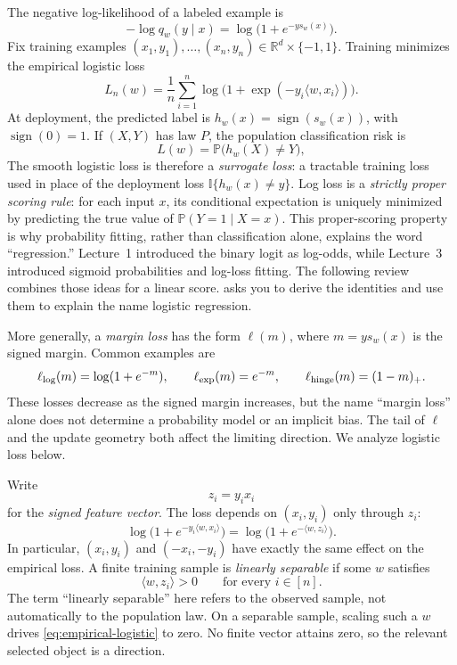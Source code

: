 \documentclass[11pt,twoside]{article}
\newcommand{\I}{\mathbb I}
\newcommand{\one}[1]{\I\{#1\}}
\renewcommand{\P}{\mathbb P}
\newcommand{\R}{\mathbb R}
\newcommand{\sign}{\operatorname{sign}}
\theoremstyle{definition}
\theoremstyle{remark}
\begin{document}
The negative log-likelihood of a labeled example is
\[
 -\log q_w(y\mid x)=\log\bigl(1+e^{-ys_w(x)}\bigr).
\]
Fix training examples
$(x_1,y_1),\ldots,(x_n,y_n)\in\R^d\times\{-1,1\}$. Training minimizes the
empirical logistic loss
\begin{equation}
 L_n(w)=\frac1n\sum_{i=1}^n
 \log\bigl(1+\exp(-y_i\langle w,x_i\rangle)\bigr).
 \label{eq:empirical-logistic}
\end{equation}
At deployment, the predicted label is $h_w(x)=\sign(s_w(x))$, with
$\sign(0)=1$. If $(X,Y)$ has law $P$, the population classification risk is
\begin{equation}
 L(w)=\P\bigl(h_w(X)\ne Y\bigr),
 \label{eq:population-risk}
\end{equation}
The smooth logistic loss is therefore a \emph{surrogate loss}: a tractable
training loss used in place of the deployment loss
$\one{h_w(x)\ne y}$. Log loss is a \emph{strictly proper scoring rule}: for
each input $x$, its conditional expectation is uniquely minimized by
predicting the true value of $\P(Y=1\mid X=x)$. This proper-scoring property
is why probability
fitting, rather than classification alone, explains the word ``regression.''
Lecture~1 introduced the binary logit as log-odds, while Lecture~3 introduced
sigmoid probabilities and log-loss fitting. The following review combines
those ideas
for a linear score.  asks you to derive the
identities and use them to explain the name logistic regression.

More generally, a \emph{margin loss} has the form $\ell(m)$, where
$m=ys_w(x)$ is the signed margin. Common examples are
\[
 \ell_{\rm log}(m)=\log(1+e^{-m}),
 \qquad
 \ell_{\rm exp}(m)=e^{-m},
 \qquad
 \ell_{\rm hinge}(m)=(1-m)_+.
\]
These losses decrease as the signed margin increases, but the name
``margin loss'' alone does not determine a probability model or an implicit
bias. The tail of $\ell$ and the update geometry both affect the limiting
direction. We analyze logistic loss below.

Write
\[
 z_i=y_ix_i
\]
for the \emph{signed feature vector}. The loss depends on $(x_i,y_i)$ only
through $z_i$:
\[
 \log\bigl(1+e^{-y_i\langle w,x_i\rangle}\bigr)
 =\log\bigl(1+e^{-\langle w,z_i\rangle}\bigr).
\]
In particular, $(x_i,y_i)$ and $(-x_i,-y_i)$ have exactly the same effect on
the empirical loss. A finite training sample is
\emph{linearly separable} if some $w$ satisfies
\begin{equation}
 \langle w,z_i\rangle>0
 \qquad\text{for every }i\in[n].
 \label{eq:separable}
\end{equation}
The term ``linearly separable'' here refers to the observed sample, not
automatically to the population law. On a separable sample, scaling such a $w$ drives
\cref{eq:empirical-logistic} to zero. No finite vector attains zero, so the
relevant selected object is a direction.
\end{document}
